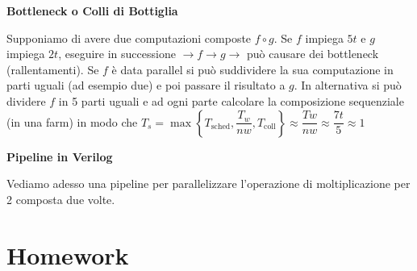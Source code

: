 
\begin{defn}
	\textbf{Bottleneck o Colli di Bottiglia}
	
	Supponiamo di avere due computazioni composte $ f \circ g $. Se $ f $
	impiega $ 5t $ e $ g $ impiega $ 2t $, eseguire in successione $ \to f \to g
	\to $ può causare dei bottleneck (rallentamenti). Se $ f $ è data parallel
	si può suddividere la sua computazione in parti uguali (ad esempio due) e
	poi passare il risultato a $ g $. In alternativa si può dividere $ f $ in 5
	parti uguali e ad ogni parte calcolare la composizione sequenziale (in una
	farm) in modo che $ T_s = \max\left\{T_\text{sched}, \dfrac{T_w}{nw},
	T_\text{coll}\right\} \approx \dfrac{Tw}{nw} \approx \dfrac{7t}{5} \approx
	1$

\end{defn}

\begin{exmp}
	\textbf{Pipeline in Verilog}
	
	Vediamo adesso una pipeline per parallelizzare l'operazione di
	moltiplicazione per 2 composta due volte.
	
	
	
	
\end{exmp}

\section{Homework}

